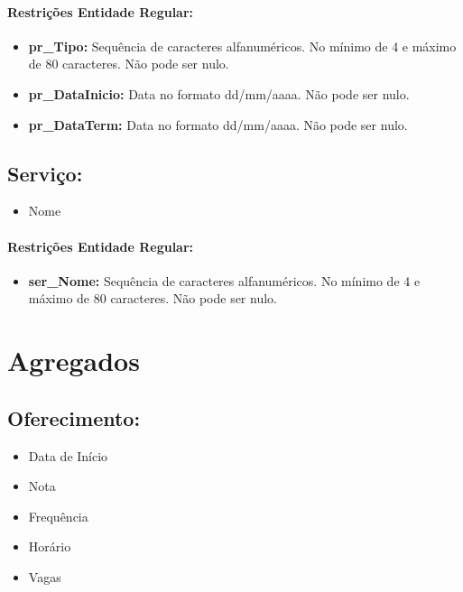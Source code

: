 \documentclass{report}
\begin{document}
\paragraph{Restrições Entidade Regular:}
\begin{itemize}
  \item \textbf{pr\_Tipo:} Sequência de caracteres alfanuméricos. No mínimo de 4 e máximo de 80 caracteres. Não pode ser nulo.
  \item \textbf{pr\_DataInicio:} Data no formato dd/mm/aaaa. Não pode ser nulo.
  \item \textbf{pr\_DataTerm:} Data no formato dd/mm/aaaa. Não pode ser nulo.
\end{itemize}

\subsection{Serviço:}
\begin{itemize}
  \item Nome
\end{itemize}
\paragraph{Restrições Entidade Regular:}
\begin{itemize}
  \item \textbf{ser\_Nome:} Sequência de caracteres alfanuméricos. No mínimo de 4 e máximo de 80 caracteres. Não pode ser nulo.
\end{itemize}

\section{Agregados}

\subsection{Oferecimento:}
\begin{itemize}
  \item Data de Início
  \item Nota
  \item Frequência
  \item Horário
  \item Vagas
\end{itemize}
\end{document}
